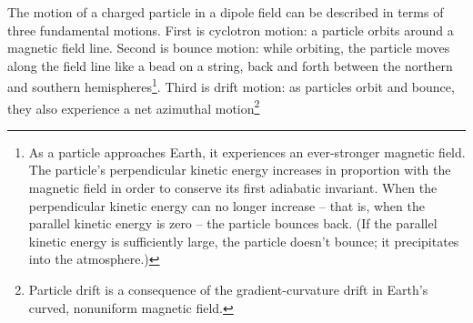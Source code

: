 








The motion of a charged particle in a dipole field can be described in terms of three fundamental motions. First is cyclotron motion: a particle orbits around a magnetic field line. Second is bounce motion: while orbiting, the particle moves along the field line like a bead on a string, back and forth between the northern and southern hemispheres\footnote{As a particle approaches Earth, it experiences an ever-stronger magnetic field. The particle's perpendicular kinetic energy increases in proportion with the magnetic field in order to conserve its first adiabatic invariant. When the perpendicular kinetic energy can no longer increase -- that is, when the parallel kinetic energy is zero -- the particle bounces back. (If the parallel kinetic energy is sufficiently large, the particle doesn't bounce; it precipitates into the atmosphere.)}. Third is drift motion: as particles orbit and bounce, they also experience a net azimuthal motion\footnote{Particle drift is a consequence of the gradient-curvature drift in Earth's curved, nonuniform magnetic field.}



